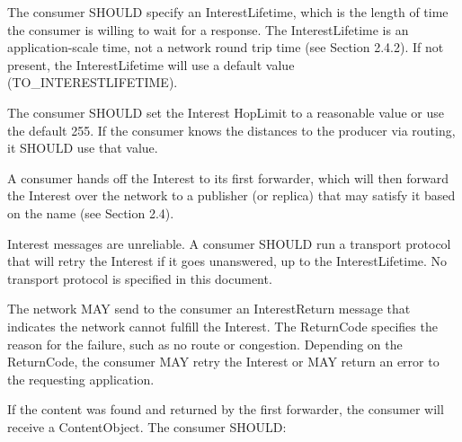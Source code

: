 \documentclass[12pt]{article}
\begin{document}
The consumer SHOULD specify an InterestLifetime, which is the length
of time the consumer is willing to wait for a response.  The
InterestLifetime is an application-scale time, not a network round
trip time (see Section 2.4.2).  If not present, the InterestLifetime
will use a default value (TO\_INTERESTLIFETIME).

The consumer SHOULD set the Interest HopLimit to a reasonable value
or use the default 255.  If the consumer knows the distances to the
producer via routing, it SHOULD use that value.

A consumer hands off the Interest to its first forwarder, which will
then forward the Interest over the network to a publisher (or
replica) that may satisfy it based on the name (see Section 2.4).

Interest messages are unreliable.  A consumer SHOULD run a transport
protocol that will retry the Interest if it goes unanswered, up to
the InterestLifetime.  No transport protocol is specified in this
document.

The network MAY send to the consumer an InterestReturn message that
indicates the network cannot fulfill the Interest.  The ReturnCode
specifies the reason for the failure, such as no route or congestion.
Depending on the ReturnCode, the consumer MAY retry the Interest or
MAY return an error to the requesting application.

If the content was found and returned by the first forwarder, the
consumer will receive a ContentObject.  The consumer SHOULD:
\end{document}
